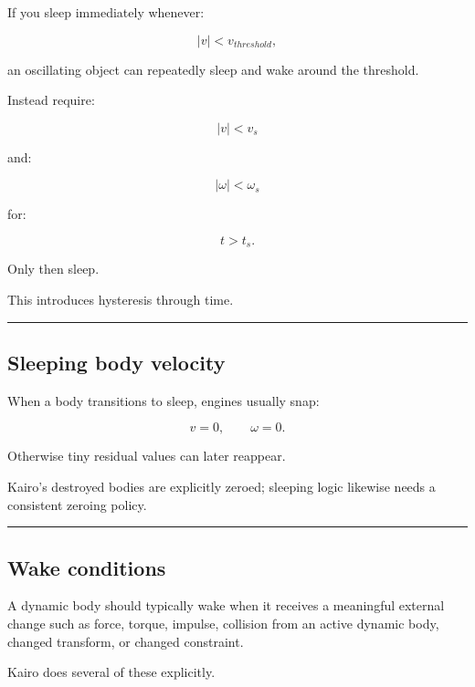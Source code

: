 \hypertarget{06-engine-ii-ch037-why-sleeping-needs-a-timer}{}

If you sleep immediately whenever:

\[
|v|<v_{threshold},
\]

an oscillating object can repeatedly sleep and wake around the threshold.

Instead require:

\[
|v|<v_s
\]

and:

\[
|\omega|<\omega_s
\]

for:

\[
t>t_s.
\]

Only then sleep.

This introduces hysteresis through time.

\begin{center}\rule{0.5\linewidth}{0.5pt}\end{center}

\subsection{Sleeping body velocity}\label{06-engine-ii-ch037-sleeping-body-velocity}

\hypertarget{06-engine-ii-ch037-sleeping-body-velocity}{}

When a body transitions to sleep, engines usually snap:

\[
v=0,
\qquad
\omega=0.
\]

Otherwise tiny residual values can later reappear.

Kairo's destroyed bodies are explicitly zeroed; sleeping logic likewise needs a consistent zeroing policy.

\begin{center}\rule{0.5\linewidth}{0.5pt}\end{center}

\subsection{Wake conditions}\label{06-engine-ii-ch037-wake-conditions}

\hypertarget{06-engine-ii-ch037-wake-conditions}{}

A dynamic body should typically wake when it receives a meaningful external change such as force, torque, impulse, collision from an active dynamic body, changed transform, or changed constraint.

Kairo does several of these explicitly.

